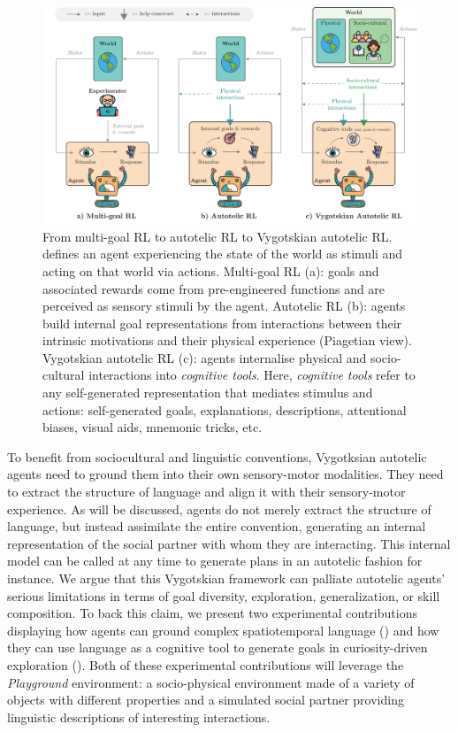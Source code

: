 \begin{figure}[!h]
    \centering
    \includegraphics[width=\textwidth]{figures/perspective/figure-intro-v4.pdf}
    \caption{From multi-goal RL to autotelic RL to Vygotskian autotelic RL. \rl defines an agent experiencing the state of the world as stimuli and acting on that world via actions. Multi-goal RL (a): goals and associated rewards come from pre-engineered functions and are perceived as sensory stimuli by the agent. Autotelic RL (b): agents build internal goal representations from interactions between their intrinsic motivations and their physical experience (Piagetian view). Vygotskian autotelic RL (c): agents internalise physical and socio-cultural interactions into \textit{cognitive tools}. Here, \textit{cognitive tools} refer to any self-generated representation that mediates stimulus and actions: self-generated goals, explanations, descriptions, attentional biases, visual aids, mnemonic tricks, etc. }
    \label{fig:towards_vygo_rl}
\end{figure}

To benefit from sociocultural and linguistic conventions, Vygotksian autotelic agents need to ground them into their own sensory-motor modalities. They need to extract the structure of language and align it with their sensory-motor experience. As will be discussed, agents do not merely extract the structure of language, but instead assimilate the entire convention, generating an internal representation of the social partner with whom they are interacting. This internal model can be called at any time to generate plans in an autotelic fashion for instance. We argue that this Vygotskian framework can palliate autotelic agents' serious limitations in terms of goal diversity, exploration, generalization, or skill composition. To back this claim, we present two experimental contributions displaying how agents can ground complex spatiotemporal language () and how they can use language as a cognitive tool to generate goals in curiosity-driven exploration (). Both of these experimental contributions will leverage the \textit{Playground} environment: a socio-physical environment made of a variety of objects with different properties and a simulated social partner providing linguistic descriptions of interesting interactions. 




